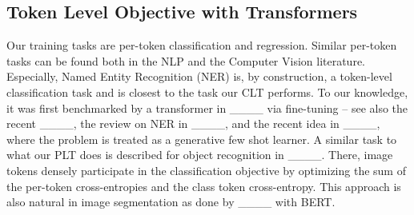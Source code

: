 \subsection{Token Level Objective with Transformers}
\label{per_token_AI}
Our training tasks are per-token classification and regression. Similar per-token tasks can be found both in the NLP and the Computer Vision literature. Especially, Named Entity Recognition (NER) is, by construction, a token-level classification task and is closest to the task our CLT performs. To our knowledge, it was first benchmarked by a transformer in ____ via fine-tuning -- see also the recent ____, the review on NER in ____, and the recent idea in ____, where the problem is treated as a generative few shot learner. A similar task to what our PLT does is described for object recognition in ____. There, image tokens densely participate in the classification objective by optimizing the sum of the per-token cross-entropies and the class token cross-entropy. This approach is also natural in image segmentation as done by ____ with BERT.